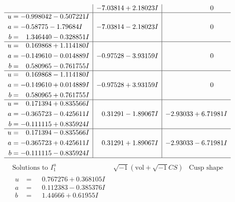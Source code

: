 \documentclass[1p]{elsarticle_modified}
\theoremstyle{definition}
\newcommand{\I}{\sqrt{-1}}
\begin{document}
$$\begin{array}{c|c|c}
 & -7.03814 + 2.18023 I & \phantom{-0.000000 } 0 \\ \hline\begin{aligned}
u &= -0.998042 - 0.507221 I \\
a &= -0.58775 - 1.79684 I \\
b &= \phantom{-}1.346440 - 0.328851 I\end{aligned}
 & -7.03814 - 2.18023 I & \phantom{-0.000000 } 0 \\ \hline\begin{aligned}
u &= \phantom{-}0.169868 + 1.114180 I \\
a &= -0.149610 - 0.014889 I \\
b &= \phantom{-}0.580965 - 0.761755 I\end{aligned}
 & -0.97528 - 3.93159 I & \phantom{-0.000000 } 0 \\ \hline\begin{aligned}
u &= \phantom{-}0.169868 - 1.114180 I \\
a &= -0.149610 + 0.014889 I \\
b &= \phantom{-}0.580965 + 0.761755 I\end{aligned}
 & -0.97528 + 3.93159 I & \phantom{-0.000000 } 0 \\ \hline\begin{aligned}
u &= \phantom{-}0.171394 + 0.835566 I \\
a &= -0.365723 - 0.425611 I \\
b &= -0.111115 + 0.835924 I\end{aligned}
 & \phantom{-}0.31291 - 1.89067 I & -2.93033 + 6.71981 I \\ \hline\begin{aligned}
u &= \phantom{-}0.171394 - 0.835566 I \\
a &= -0.365723 + 0.425611 I \\
b &= -0.111115 - 0.835924 I\end{aligned}
 & \phantom{-}0.31291 + 1.89067 I & -2.93033 - 6.71981 I\\
 \hline 
 \end{array}$$\newpage$$\begin{array}{c|c|c}  
\text{Solutions to }I^u_{1}& \I (\text{vol} + \sqrt{-1}CS) & \text{Cusp shape}\\
 \hline 
\begin{aligned}
u &= \phantom{-}0.767276 + 0.368105 I \\
a &= \phantom{-}0.112383 - 0.385376 I \\
b &= \phantom{-}1.44666 + 0.61955 I\end{aligned}

\end{array}$$
\end{document}

